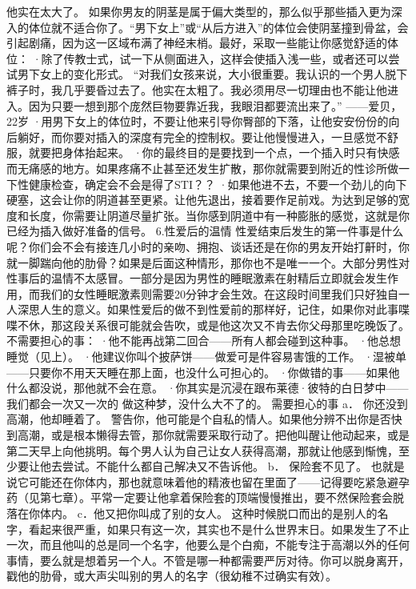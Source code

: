 \documentclass[12pt,UTF8]{ctexbook}
\begin{document}
他实在太大了。
如果你男友的阴茎是属于偏大类型的，那么似乎那些插入更为深入的体位就不适合你了。“男下女上”或“从后方进入”的体位会使阴茎撞到骨盆，会引起剧痛，因为这一区域布满了神经末梢。最好，采取一些能让你感觉舒适的体位：
·除了传教士式，试一下从侧面进入，这样会使插入浅一些，或者还可以尝试男下女上的变化形式。
“对我们女孩来说，大小很重要。我认识的一个男人脱下裤子时，我几乎要昏过去了。他实在太粗了。我必须用尽一切理由也不能让他进入。因为只要一想到那个庞然巨物要靠近我，我眼泪都要流出来了。”
——爱贝，22岁
·用男下女上的体位时，不要让他来引导你臀部的下落，让他安安份份的向后躺好，而你要对插入的深度有完全的控制权。要让他慢慢进入，一旦感觉不舒服，就要把身体抬起来。
·你的最终目的是要找到一个点，一个插入时只有快感而无痛感的地方。如果疼痛不止甚至还发生扩散，那你就需要到附近的性诊所做一下性健康检查，确定会不会是得了STI？？
·如果他进不去，不要一个劲儿的向下硬塞，这会让你的阴道甚至更紧。让他先退出，接着要作足前戏。为达到足够的宽度和长度，你需要让阴道尽量扩张。当你感到阴道中有一种膨胀的感觉，这就是你已经为插入做好准备的信号。
6.性爱后的温情
性爱结束后发生的第一件事是什么呢？你们会不会有接连几小时的亲吻、拥抱、谈话还是在你的男友开始打鼾时，你就一脚踹向他的肋骨？如果是后面这种情形，那你也不是唯一一个。大部分男性对性事后的温情不太感冒。一部分是因为男性的睡眠激素在射精后立即就会发生作用，而我们的女性睡眠激素则需要20分钟才会生效。在这段时间里我们只好独自一人深思人生的意义。如果性爱后的做不到性爱前的那样好，记住，如果你对此事喋喋不休，那这段关系很可能就会告吹，或是他这次又不肯去你父母那里吃晚饭了。
不需要担心的事：
·他不能再战第二回合——所有人都会碰到这种事。
·他总想睡觉（见上）。
·他建议你叫个披萨饼——做爱可是件容易害饿的工作。
·湿被单——只要你不用天天睡在那上面，也没什么可担心的。
·你做错的事——如果他什么都没说，那他就不会在意。
·你其实是沉浸在跟布莱德·彼特的白日梦中——我们都会一次又一次的 做这种梦，没什么大不了的。
需要担心的事
a． 你还没到高潮，他却睡着了。
警告你，他可能是个自私的情人。如果他分辨不出你是否快到高潮，或是根本懒得去管，那你就需要采取行动了。把他叫醒让他动起来，或是第二天早上向他挑明。每个男人认为自己让女人获得高潮，那就让他感到惭愧，至少要让他去尝试。不能什么都自己解决又不告诉他。
b． 保险套不见了。
也就是说它可能还在你体内，那也就意味着他的精液也留在里面了——记得要吃紧急避孕药（见第七章）。平常一定要让他拿着保险套的顶端慢慢推出，要不然保险套会脱落在你体内。
c．他又把你叫成了别的女人。
这种时候脱口而出的是别人的名字，看起来很严重，如果只有这一次，其实也不是什么世界末日。如果发生了不止一次，而且他叫的总是同一个名字，他要么是个白痴，不能专注于高潮以外的任何事情，要么就是想着另一个人。不管是哪一种都需要严厉对待。你可以脱身离开，戳他的肋骨，或大声尖叫别的男人的名字（很幼稚不过确实有效）。
\end{document}
